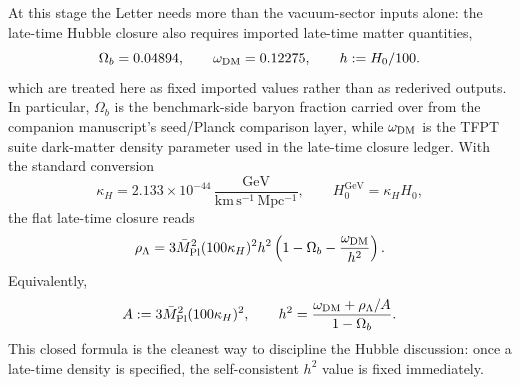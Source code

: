 At this stage the Letter needs more than the vacuum-sector inputs alone: the late-time Hubble closure also requires imported late-time matter quantities,
\begin{equation}
\Omega_b=0.04894,
\qquad
\omega_{\mathrm{DM}}=0.12275,
\qquad
h:=H_0/100.
\label{eq:matter-inputs}
\end{equation}
which are treated here as fixed imported values rather than as rederived outputs. In particular, $\Omega_b$ is the benchmark-side baryon fraction carried over from the companion manuscript's seed/Planck comparison layer, while $\omega_{\mathrm{DM}}$ is the TFPT suite dark-matter density parameter used in the late-time closure ledger.
With the standard conversion
\[
\kappa_H=2.133\times10^{-44}\,
\frac{\mathrm{GeV}}{\mathrm{km\,s^{-1}\,Mpc^{-1}}},
\qquad
H_0^{\mathrm{GeV}}=\kappa_H H_0,
\]
the flat late-time closure reads
\begin{equation}
\rho_{\Lambda}
=
3\bar M_{\mathrm{Pl}}^2(100\kappa_H)^2h^2
\left(1-\Omega_b-\frac{\omega_{\mathrm{DM}}}{h^2}\right).
\label{eq:friedmann}
\end{equation}
Equivalently,
\begin{equation}
A:=3\bar M_{\mathrm{Pl}}^2(100\kappa_H)^2,
\qquad
h^2
=
\frac{\omega_{\mathrm{DM}}+\rho_{\Lambda}/A}{1-\Omega_b}.
\label{eq:h2-closed}
\end{equation}
This closed formula is the cleanest way to discipline the Hubble discussion: once a late-time density is specified, the self-consistent $h^2$ value is fixed immediately.

